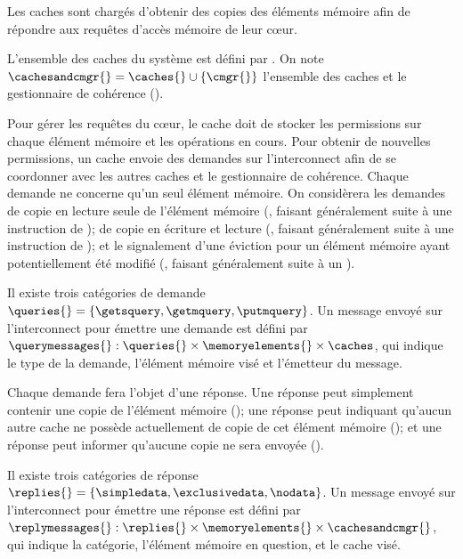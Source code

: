 Les caches sont chargés d'obtenir des copies des éléments mémoire afin de
répondre aux requêtes d'accès mémoire de leur cœur.


\begin{definition}
\label{fr:def:cache}
L'ensemble des caches du système est défini  par \caches{}.
On note $\cachesandcmgr{} = \caches{} \cup \{\cmgr{}\}$ l'ensemble des caches et le gestionnaire
de cohérence (\cmgr{}).
\end{definition}
Pour gérer les requêtes du c\oe ur,
le cache doit de stocker les
permissions sur chaque élément mémoire
et les opérations en cours.
Pour obtenir de nouvelles permissions, un cache envoie des demandes sur
l'interconnect afin de se coordonner avec les autres caches et le gestionnaire de cohérence.
Chaque demande ne concerne qu'un seul élément mémoire.
On considèrera les demandes de copie en lecture seule
de l'élément mémoire (\getsquery, faisant généralement suite à une instruction
de \loadinstr{}); de copie en écriture et lecture (\getmquery,
faisant généralement suite à une instruction de \storeinstr{}); et le signalement
d'une éviction pour un élément mémoire ayant potentiellement été modifié
(\putmquery, faisant généralement suite à un \evictinstr{}).

\begin{definition}[Demande]
Il existe trois catégories de demande $\queries{} = \{\getsquery,
\getmquery, \putmquery\}$.
Un message envoyé sur l'interconnect pour émettre une demande est défini par
$\querymessages{}: \queries{} \times \memoryelements{} \times \caches$, qui
indique le type de la demande, l'élément mémoire visé et l'émetteur du message.
\end{definition}

Chaque demande fera l'objet d'une réponse.
Une réponse peut simplement contenir une copie de l'élément mémoire (\simpledata);
une réponse peut indiquant qu'aucun autre cache ne possède actuellement de copie de cet élément
mémoire (\exclusivedata); et une réponse peut informer qu'aucune copie ne sera
envoyée (\nodata).


\begin{definition}[Réponse]
Il existe trois catégories de réponse $\replies{} =
\{\simpledata,
\allowbreak{}
\exclusivedata,\allowbreak{} \nodata\}$.
Un message envoyé sur l'interconnect pour émettre une réponse est défini par
$\replymessages{}:
\replies{} \times \memoryelements{} \times \cachesandcmgr{}$, qui indique la
catégorie, l'élément mémoire en question, et le cache visé.
\end{definition}

